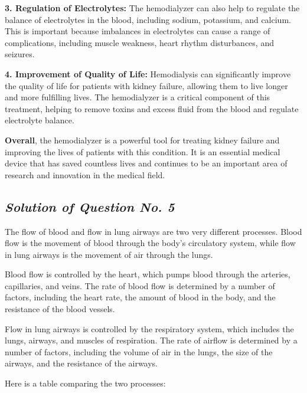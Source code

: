 \documentclass[12pt, a4paper]{article} %
\begin{document}
{\bf 3. Regulation of Electrolytes:} The hemodialyzer can also help to regulate the balance of electrolytes in the blood, including sodium, potassium, and calcium. This is important because imbalances in electrolytes can cause a range of complications, including muscle weakness, heart rhythm disturbances, and seizures.

{\bf 4. Improvement of Quality of Life:} Hemodialysis can significantly improve the quality of life for patients with kidney failure, allowing them to live longer and more fulfilling lives. The hemodialyzer is a critical component of this treatment, helping to remove toxins and excess fluid from the blood and regulate electrolyte balance.

{\bf Overall}, the hemodialyzer is a powerful tool for treating kidney failure and improving the lives of patients with this condition. It is an essential medical device that has saved countless lives and continues to be an important area of research and innovation in the medical field.

\pagebreak

\subsection{\slshape Solution of Question No. 5}

The flow of blood and flow in lung airways are two very different processes. Blood flow is the movement of blood through the body's circulatory system, while flow in lung airways is the movement of air through the lungs.

Blood flow is controlled by the heart, which pumps blood through the arteries, capillaries, and veins. The rate of blood flow is determined by a number of factors, including the heart rate, the amount of blood in the body, and the resistance of the blood vessels.

Flow in lung airways is controlled by the respiratory system, which includes the lungs, airways, and muscles of respiration. The rate of airflow is determined by a number of factors, including the volume of air in the lungs, the size of the airways, and the resistance of the airways.

Here is a table comparing the two processes:
\end{document}

